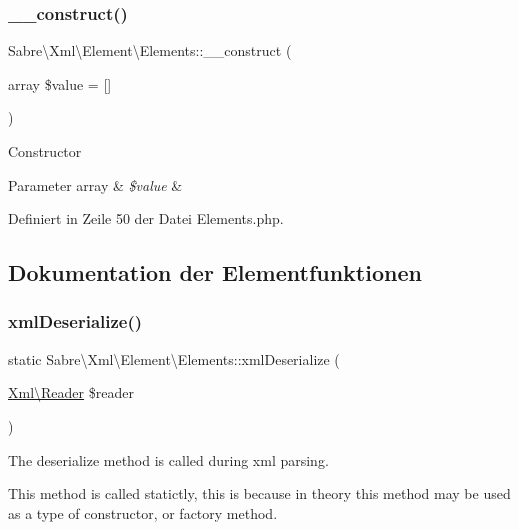 \subsubsection{\texorpdfstring{\+\_\+\+\_\+construct()}{\_\_construct()}}
{\footnotesize\ttfamily Sabre\textbackslash{}\+Xml\textbackslash{}\+Element\textbackslash{}\+Elements\+::\+\_\+\+\_\+construct (\begin{DoxyParamCaption}\item[{array}]{\$value = {\ttfamily \mbox{[}\mbox{]}} }\end{DoxyParamCaption})}

Constructor


\begin{DoxyParams}[1]{Parameter}
array & {\em \$value} & \\
\hline
\end{DoxyParams}


Definiert in Zeile 50 der Datei Elements.\+php.



\subsection{Dokumentation der Elementfunktionen}
\mbox{\label{class_sabre_1_1_xml_1_1_element_1_1_elements_a4e517e8747e5e2e2eda0c5f8dde40f4b}} 
\subsubsection{\texorpdfstring{xml\+Deserialize()}{xmlDeserialize()}}
{\footnotesize\ttfamily static Sabre\textbackslash{}\+Xml\textbackslash{}\+Element\textbackslash{}\+Elements\+::xml\+Deserialize (\begin{DoxyParamCaption}\item[{\mbox{\hyperlink{class_sabre_1_1_xml_1_1_reader}{Xml\textbackslash{}\+Reader}}}]{\$reader }\end{DoxyParamCaption})\hspace{0.3cm}{\ttfamily [static]}}

The deserialize method is called during xml parsing.

This method is called statictly, this is because in theory this method may be used as a type of constructor, or factory method.

